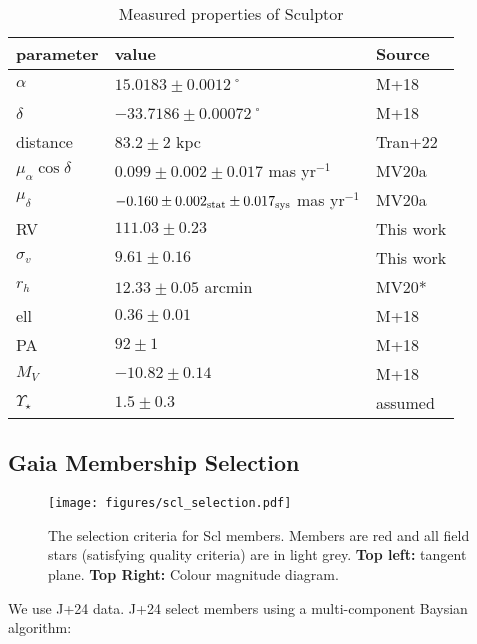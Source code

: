 \begin{table*}[t]
\centering
\caption{Measured properties of Sculptor}
\label{tbl:Measured-properties-of-Sculptor}
\begin{tabular}{lll}
\toprule
parameter & value & Source\\
\midrule
$\alpha$ & $15.0183 \pm 0.0012$˚ & M+18\\
$\delta$ & $-33.7186 \pm 0.00072$˚ & M+18\\
distance & $83.2 \pm 2$ kpc & Tran+22\\
$\mu_\alpha \cos \delta$ & $0.099 \pm 0.002 \pm 0.017$ mas yr$^{-1}$ & MV20a\\
$\mu_\delta$ & $-0.160 \pm 0.002_{\rm stat} \pm 0.017_{\rm sys}$ mas yr$^{-1}$ & MV20a\\
RV & $111.03 \pm 0.23$ & This work\\
$\sigma_v$ & $9.61\pm0.16$ & This work\\
$r_h$ & $12.33 \pm 0.05$ arcmin & MV20*\\
ell & $0.36 \pm 0.01$ & M+18\\
PA & $92\pm1$ & M+18\\
$M_V$ & $-10.82\pm0.14$ & M+18\\
$\Upsilon_\star$ & $1.5 \pm 0.3$ & assumed\\
\bottomrule
\end{tabular}
\end{table*}

\subsection{Gaia Membership Selection}\label{gaia-membership-selection}

\begin{figure}
\centering
\texttt{[image: figures/scl\_selection.pdf]}
\caption[Sculptor selection criteria]{The selection criteria for Scl
members. Members are red and all field stars (satisfying quality
criteria) are in light grey. \textbf{Top left:} tangent plane.
\textbf{Top Right:} Colour magnitude
diagram.}\label{fig:sculptor_selection}
\end{figure}

We use J+24 data. J+24 select members using a multi-component Baysian
algorithm:

